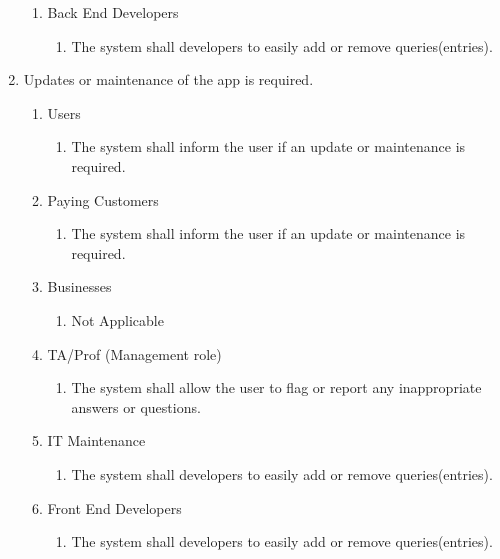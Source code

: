 \documentclass[titlepage]{article}
\begin{document}
\begin{enumerate}[\textbf{{BE}1.}]
\begin{enumerate}[\textbf{{VP2}.1}]
				\item Back End Developers
				\begin{enumerate}
					\item The system shall developers to easily add or remove queries(entries).
				\end{enumerate}
			\end{enumerate}
			
			\item Updates or maintenance of the app is required.
			\begin{enumerate}[\textbf{{VP3}.1}]
				
				\item Users
				\begin{enumerate}
					\item The system shall inform the user if an update or maintenance is required.
				\end{enumerate}
				
				\item Paying Customers
				\begin{enumerate}
					\item The system shall inform the user if an update or maintenance is required.
				\end{enumerate}
				
				\item Businesses
				\begin{enumerate}
					\item Not Applicable
				\end{enumerate}
				
				\item TA/Prof (Management role)
				\begin{enumerate}
					\item The system shall allow the user to flag or report any inappropriate answers or questions.
				\end{enumerate}
				
				\item IT Maintenance
				\begin{enumerate}
					\item  The system shall developers to easily add or remove queries(entries).
				\end{enumerate}
				
				\item Front End Developers
				\begin{enumerate}
					\item The system shall developers to easily add or remove queries(entries).
				\end{enumerate}
				

\end{enumerate}
\end{enumerate}
\end{document}
